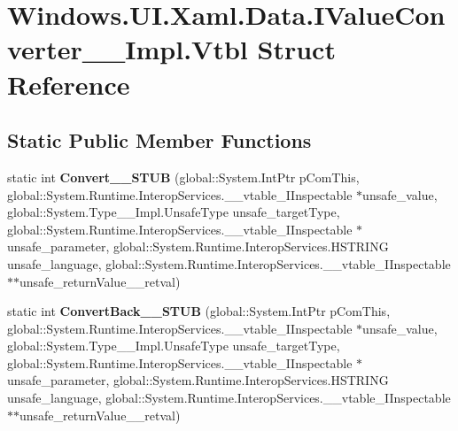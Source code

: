 \hypertarget{struct_windows_1_1_u_i_1_1_xaml_1_1_data_1_1_i_value_converter_____impl_1_1_vtbl}{}\section{Windows.\+U\+I.\+Xaml.\+Data.\+I\+Value\+Converter\+\_\+\+\_\+\+Impl.\+Vtbl Struct Reference}
\label{struct_windows_1_1_u_i_1_1_xaml_1_1_data_1_1_i_value_converter_____impl_1_1_vtbl}
\subsection*{Static Public Member Functions}
\begin{DoxyCompactItemize}
\item 
\mbox{\label{struct_windows_1_1_u_i_1_1_xaml_1_1_data_1_1_i_value_converter_____impl_1_1_vtbl_aad498aa18051b0397a2382c868b62168}} 
static int {\bfseries Convert\+\_\+\+\_\+\+S\+T\+UB} (global\+::\+System.\+Int\+Ptr p\+Com\+This, global\+::\+System.\+Runtime.\+Interop\+Services.\+\_\+\+\_\+vtable\+\_\+\+I\+Inspectable $\ast$unsafe\+\_\+value, global\+::\+System.\+Type\+\_\+\+\_\+\+Impl.\+Unsafe\+Type unsafe\+\_\+target\+Type, global\+::\+System.\+Runtime.\+Interop\+Services.\+\_\+\+\_\+vtable\+\_\+\+I\+Inspectable $\ast$unsafe\+\_\+parameter, global\+::\+System.\+Runtime.\+Interop\+Services.\+H\+S\+T\+R\+I\+NG unsafe\+\_\+language, global\+::\+System.\+Runtime.\+Interop\+Services.\+\_\+\+\_\+vtable\+\_\+\+I\+Inspectable $\ast$$\ast$unsafe\+\_\+return\+Value\+\_\+\+\_\+retval)
\item 
\mbox{\label{struct_windows_1_1_u_i_1_1_xaml_1_1_data_1_1_i_value_converter_____impl_1_1_vtbl_ad8c751d6dd6e13f3655511062d880c14}} 
static int {\bfseries Convert\+Back\+\_\+\+\_\+\+S\+T\+UB} (global\+::\+System.\+Int\+Ptr p\+Com\+This, global\+::\+System.\+Runtime.\+Interop\+Services.\+\_\+\+\_\+vtable\+\_\+\+I\+Inspectable $\ast$unsafe\+\_\+value, global\+::\+System.\+Type\+\_\+\+\_\+\+Impl.\+Unsafe\+Type unsafe\+\_\+target\+Type, global\+::\+System.\+Runtime.\+Interop\+Services.\+\_\+\+\_\+vtable\+\_\+\+I\+Inspectable $\ast$unsafe\+\_\+parameter, global\+::\+System.\+Runtime.\+Interop\+Services.\+H\+S\+T\+R\+I\+NG unsafe\+\_\+language, global\+::\+System.\+Runtime.\+Interop\+Services.\+\_\+\+\_\+vtable\+\_\+\+I\+Inspectable $\ast$$\ast$unsafe\+\_\+return\+Value\+\_\+\+\_\+retval)

\end{DoxyCompactItemize}
